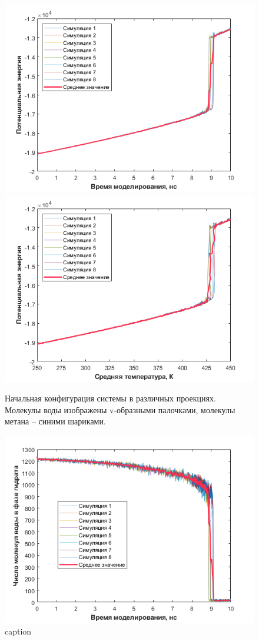 \begin{figure}[H]
    \begin{minipage}{\linewidth}
        \includegraphics[width=.5\linewidth]{figures/density_temp.png}\hfill
        \includegraphics[width=.5\linewidth]{figures/pe_temp.png}
    \end{minipage}
    \caption{Начальная конфигурация системы в различных проекциях. Молекулы воды изображены v-образными палочками, молекулы метана -- синими шариками.}
    \label{fig3.13}
\end{figure}

\begin{figure}[H]
    \centering
    \includegraphics{figures/hydr.png}
    \caption{caption}
    \label{fig3.14}
\end{figure}